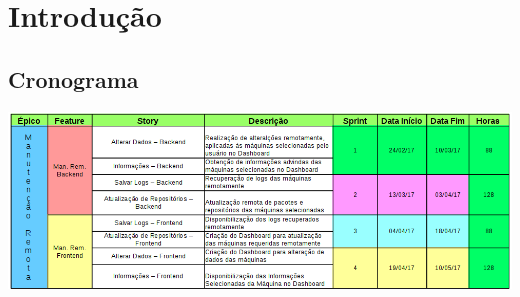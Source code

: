 \chapter[Introdução]{Introdução}
\section{Cronograma}
\begin{center}
\includegraphics[scale=0.6,angle=90]{figuras/cronograma.png}
\end{center}
